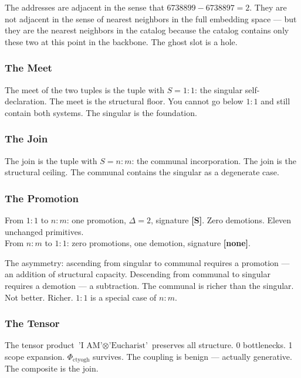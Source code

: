 \documentclass[12pt,a4paper]{article}
\begin{document}
The addresses are adjacent in the sense that $6738899 - 6738897 = 2$. They are not adjacent in the sense of nearest neighbors in the full embedding space --- but they are the nearest neighbors in the catalog because the catalog contains only these two at this point in the backbone. The ghost slot is a hole.

\subsubsection{The Meet}

The meet of the two tuples is the tuple with $S = 1{:}1$: the singular self-declaration. The meet is the structural floor. You cannot go below $1{:}1$ and still contain both systems. The singular is the foundation.

\subsubsection{The Join}

The join is the tuple with $S = n{:}m$: the communal incorporation. The join is the structural ceiling. The communal contains the singular as a degenerate case.

\subsubsection{The Promotion}

From $1{:}1$ to $n{:}m$: one promotion, $\Delta = 2$, signature \textbf{{[}S{]}}. Zero demotions. Eleven unchanged primitives. \\
From $n{:}m$ to $1{:}1$: zero promotions, one demotion, signature \textbf{{[}none{]}}.

The asymmetry: ascending from singular to communal requires a promotion --- an addition of structural capacity. Descending from communal to singular requires a demotion --- a subtraction. The communal is richer than the singular. Not better. Richer. $1{:}1$ is a special case of $n{:}m$.

\subsubsection{The Tensor}

The tensor product $\text{'I AM'} \otimes \text{'Eucharist'}$ preserves all structure. 0 bottlenecks. 1 scope expansion. $\Phi_{\text{ctyogh}}$ survives. The coupling is benign --- actually generative. The composite is the join.
\end{document}
